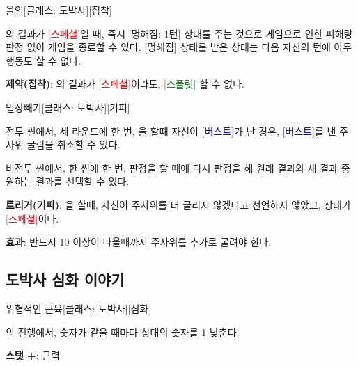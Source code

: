 \documentclass{report}
\begin{document}
	\begin{story}{올인}{[클래스: 도박사][집착]}
		
		의 결과가 \textcolor{red}{[스페셜]}일 때, 즉시 [멍해짐: 1턴] 상태를 주는 것으로 게임으로 인한 피해량 판정 없이 게임을 종료할 수 있다. [멍해짐] 상태를 받은 상대는 다음 자신의 턴에 아무 행동도 할 수 없다.
		
		\smallskip
		
		\textbf{제약(집착)}: 의 결과가 \textcolor{red}{[스페셜]}이라도, \textcolor{green}{[스플릿]} 할 수 없다.
		
	\end{story}
	
	\begin{story}{밑장빼기}{[클래스: 도박사][기피]}
		
		전투 씬에서, 세 라운드에 한 번, 을 할때 자신이 \textcolor{blue}{[버스트]}가 난 경우, \textcolor{blue}{[버스트]}를 낸 주사위 굴림을 취소할 수 있다.
		
		\smallskip
		
		비전투 씬에서, 한 씬에 한 번, 판정을 할 때에 다시 판정을 해 원래 결과와 새 결과 중 원하는 결과를 선택할 수 있다.
		
		\smallskip
		
		\textbf{트리거(기피)}: 을 할때, 자신이 주사위를 더 굴리지 않겠다고 선언하지 않았고, 상대가 \textcolor{red}{[스페셜]}이다.
		
		\textbf{효과}: 반드시 10 이상이 나올때까지 주사위를 추가로 굴려야 한다.
		
	\end{story}
	
	\subsection{도박사 심화 이야기}
	
	\begin{story}{위협적인 근육}{[클래스: 도박사][심화]}
		
		의 진행에서, 숫자가 같을 때마다 상대의 숫자를 1 낮춘다.
		
		\smallskip
		
		\textbf{스탯 +}: 근력
		
	\end{story}
	
\end{document}
